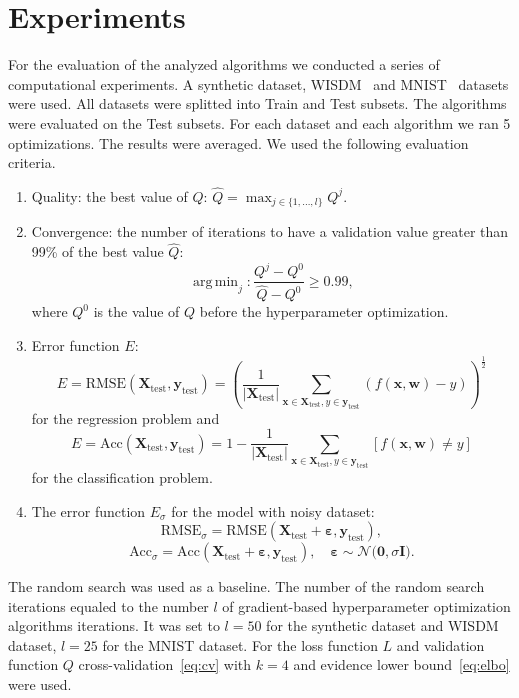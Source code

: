 \documentclass[smallextended]{svjour3}
\DeclareMathOperator*{\argmin}{arg\,min}
\begin{document}
\section{Experiments}
\label{experiments}
For the evaluation of the analyzed algorithms we conducted a series of computational experiments. A synthetic dataset, WISDM~\cite{wisdm} and MNIST~\cite{mnist} datasets were used. All datasets were splitted into Train and Test subsets. The  algorithms were evaluated on the Test subsets. For each dataset and each algorithm we ran 5 optimizations. The results were averaged. 
We used the following evaluation criteria.
\begin{enumerate}
\item Quality: the best value of $Q$:  $\hat{Q} = \max_{j \in \{1, \dots, l\}}Q^j$.
\item Convergence: the number of iterations to have a validation value greater than 99\% of the best value $\hat{Q}$:
\[
    \argmin_{j}: \frac{Q^j - Q^0}{\hat{Q} - Q^0} \geq 0.99,
\]
where $Q^0$ is the value of $Q$ before the hyperparameter optimization. 


\item Error function $E$:\[
    E = \text{RMSE}(\mathbf{X}_\text{test}, \mathbf{y}_\text{test}) = \left (\frac{1}{|\mathbf{X}_\text{test}|}\sum_{\mathbf{x} \in\mathbf{X}_\text{test}, y \in \mathbf{y}_\text{test}}  (f(\mathbf{x}, \mathbf{w})-y)\right)^{\frac{1}{2}}
\]
for the regression problem and
\[
    E = \text{Acc}(\mathbf{X}_\text{test}, \mathbf{y}_\text{test}) = 1 - \frac{1}{|\mathbf{X}_\text{test}|}\sum_{\mathbf{x} \in\mathbf{X}_\text{test}, y \in \mathbf{y}_\text{test}} [f(\mathbf{x}, \mathbf{w}) \neq y]
\]
for the classification problem.


\item The error function  $E_\sigma$ for the model with noisy dataset:
\[
    \text{RMSE}_\sigma =  \text{RMSE}(\mathbf{X}_\text{test} +  \boldsymbol{\varepsilon}, \mathbf{y}_\text{test}),\]\[\text{Acc}_\sigma =  \text{Acc}(\mathbf{X}_\text{test} +  \boldsymbol{\varepsilon}, \mathbf{y}_\text{test}),  \quad \boldsymbol{\varepsilon} \sim \mathcal{N}\bigl(\mathbf{0}, \sigma\mathbf{I}\bigr).
\]
\end{enumerate}



The random search was used as a baseline. The number of the random search iterations equaled to the number $l$ of gradient-based hyperparameter optimization algorithms iterations. It was set to $l=50$ for the synthetic dataset and WISDM dataset, $l=25$ for the MNIST dataset.  For the loss  function $L$ and validation function $Q$ cross-validation~\eqref{eq:cv} with $k=4$ and evidence lower bound~\eqref{eq:elbo} were used. 
\end{document}
